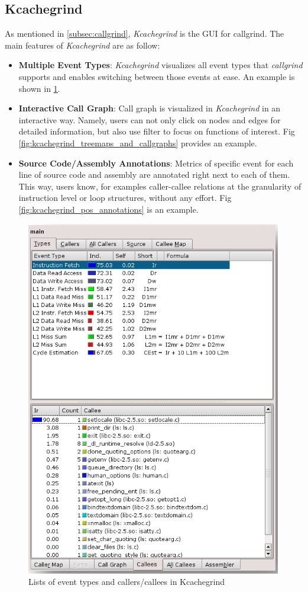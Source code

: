 \subsection{Kcachegrind}
\label{subsec:kcachegrind}

As mentioned in \ref{subsec:callgrind}, \textit{Kcachegrind} is the GUI for callgrind. The main features of \textit{Kcachegrind} are as follow:

\begin{itemize}
    \item \textbf{Multiple Event Types}: \textit{Kcachegrind} visualizes all event types that \textit{callgrind} supports and enables switching between those events at ease. An example is shown in \ref{fig:kcachegrind_caller_callee}.
    
    \item \textbf{Interactive Call Graph}: Call graph is visualized in \textit{Kcachegrind} in an interactive way. Namely, users can not only click on nodes and edges for detailed information, but also use filter to focus on functions of interest. Fig \ref{fig:kcachegrind_treemaps_and_callgraphs} provides an example.
    
    \item \textbf{Source Code/Assembly Annotations}: Metrics of specific event for each line of source code and assembly are annotated right next to each of them. This way, users know, for examples caller-callee relations at the granularity of instruction level or loop structures, without any effort. Fig \ref{fig:kcachegrind_pos_annotations} is an example.
\end{itemize}

\begin{figure}
    \centering
    \includegraphics[width=0.65\linewidth]{figures/kcachegrind_caller_callee.png}
    \caption{Lists of event types and callers/callees in Kcachegrind~\cite{kcachegrind}}
    \label{fig:kcachegrind_caller_callee}
\end{figure}

